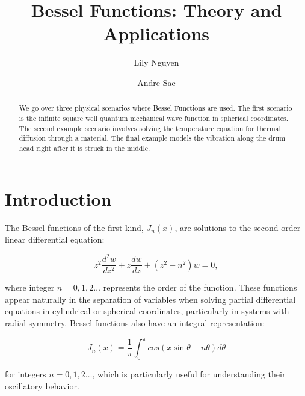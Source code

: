 \documentclass[linenumbers, RNAAS, trackchanges]{aastex631}
\begin{document}
\title{Bessel Functions: Theory and Applications}
\author{Lily Nguyen}

\author{Andre Sae}


\begin{abstract}

We go over three physical scenarios where Bessel Functions are used. The first 
scenario is the infinite square well quantum mechanical wave function in 
spherical coordinates. The second example scenario involves solving the 
temperature equation for thermal diffusion through a material. The final 
example models the vibration along the drum head right after it is struck in 
the middle. 

\end{abstract}



\section{Introduction} \label{sec:intro}

The Bessel functions of the first kind, $J_n(x)$, are solutions to the
second-order linear differential equation:

\begin{equation}
    z^2\frac{d^2 w}{dz^2}+z\frac{dw}{dz}+(z^2-n^2)w=0,
\end{equation}

\noindent where integer $n=0,1,2\dots$ represents the order of the
function. These functions appear naturally in the separation of variables when solving
partial differential equations in cylindrical or spherical coordinates,
particularly in systems with radial symmetry. Bessel functions also have an
integral representation:

\begin{equation}
    J_n(x)=\frac{1}{\pi}\int_0^\pi cos(x\sin\theta-n\theta)d\theta
\end{equation}

\noindent for integers $n=0,1,2\dots$, which is particularly useful for understanding 
their oscillatory behavior.
\end{document}

